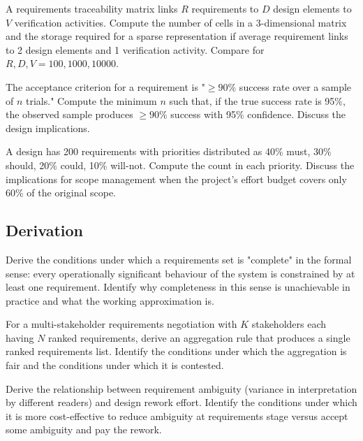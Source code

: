 \begin{exercise}
A requirements traceability matrix links $R$ requirements to $D$ design elements to $V$ verification activities. Compute the number of cells in a 3-dimensional matrix and the storage required for a sparse representation if average requirement links to 2 design elements and 1 verification activity. Compare for $R, D, V = 100, 1000, 10000$.
\end{exercise}

\begin{exercise}
The acceptance criterion for a requirement is "$\geq 90\%$ success rate over a sample of $n$ trials." Compute the minimum $n$ such that, if the true success rate is 95\%, the observed sample produces $\geq 90\%$ success with 95\% confidence. Discuss the design implications.
\end{exercise}

\begin{exercise}
A design has 200 requirements with priorities distributed as 40\% must, 30\% should, 20\% could, 10\% will-not. Compute the count in each priority. Discuss the implications for scope management when the project's effort budget covers only 60\% of the original scope.
\end{exercise}

\subsection*{Derivation}

\begin{exercise}
Derive the conditions under which a requirements set is "complete" in the formal sense: every operationally significant behaviour of the system is constrained by at least one requirement. Identify why completeness in this sense is unachievable in practice and what the working approximation is.
\end{exercise}

\begin{exercise}
For a multi-stakeholder requirements negotiation with $K$ stakeholders each having $N$ ranked requirements, derive an aggregation rule that produces a single ranked requirements list. Identify the conditions under which the aggregation is fair and the conditions under which it is contested.
\end{exercise}

\begin{exercise}
Derive the relationship between requirement ambiguity (variance in interpretation by different readers) and design rework effort. Identify the conditions under which it is more cost-effective to reduce ambiguity at requirements stage versus accept some ambiguity and pay the rework.
\end{exercise}

